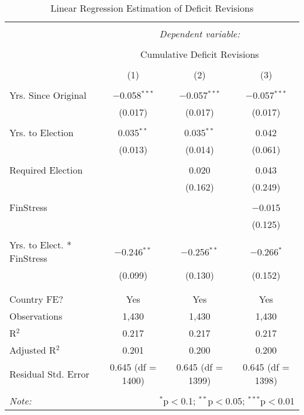 
\begin{table}[!htbp] \centering 
  \caption{Linear Regression Estimation of Deficit Revisions} 
  \label{deficit_results} 
\footnotesize 
\begin{tabular}{@{\extracolsep{5pt}}lccc} 
\\[-1.8ex]\hline 
\hline \\[-1.8ex] 
 & \multicolumn{3}{c}{\textit{Dependent variable:}} \\ 
\cline{2-4} 
\\[-1.8ex] & \multicolumn{3}{c}{Cumulative Deficit Revisions} \\ 
\\[-1.8ex] & (1) & (2) & (3)\\ 
\hline \\[-1.8ex] 
 Yrs. Since Original & $-$0.058$^{***}$ & $-$0.057$^{***}$ & $-$0.057$^{***}$ \\ 
  & (0.017) & (0.017) & (0.017) \\ 
  & & & \\ 
 Yrs. to Election & 0.035$^{**}$ & 0.035$^{**}$ & 0.042 \\ 
  & (0.013) & (0.014) & (0.061) \\ 
  & & & \\ 
 Required Election &  & 0.020 & 0.043 \\ 
  &  & (0.162) & (0.249) \\ 
  & & & \\ 
 FinStress &  &  & $-$0.015 \\ 
  &  &  & (0.125) \\ 
  & & & \\ 
 Yrs. to Elect. * FinStress & $-$0.246$^{**}$ & $-$0.256$^{**}$ & $-$0.266$^{*}$ \\ 
  & (0.099) & (0.130) & (0.152) \\ 
  & & & \\ 
\hline \\[-1.8ex] 
Country FE? & Yes & Yes & Yes \\ 
Observations & 1,430 & 1,430 & 1,430 \\ 
R$^{2}$ & 0.217 & 0.217 & 0.217 \\ 
Adjusted R$^{2}$ & 0.201 & 0.200 & 0.200 \\ 
Residual Std. Error & 0.645 (df = 1400) & 0.645 (df = 1399) & 0.645 (df = 1398) \\ 
\hline 
\hline \\[-1.8ex] 
\textit{Note:}  & \multicolumn{3}{r}{$^{*}$p$<$0.1; $^{**}$p$<$0.05; $^{***}$p$<$0.01} \\ 
\end{tabular} 
\end{table} 
